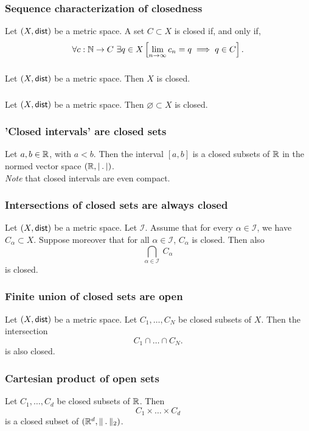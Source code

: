 \subsubsection*{Sequence characterization of closedness}
\uprop Let $(X, \mathsf{dist})$ be a metric space. A set $C \subset X$ is closed if,
and only if,
\[
    \forall c : \mathbb{N} \to C\ \exists q \in X \left[ \lim_{n \to \infty} c_n = q \implies q \in C \right].
\]

\subsubsection*{}
\uprop Let $(X, \mathsf{dist})$ be a metric space. Then $X$ is closed.

\subsubsection*{}
\uprop Let $(X, \mathsf{dist})$ be a metric space. Then $\varnothing \subset X$ is closed.

\subsubsection*{'Closed intervals' are closed sets}
\uprop Let $a, b \in \mathbb{R}$, with $a < b$. Then the interval $[a,b]$ is a closed
subsets of $\mathbb{R}$ in the normed vector space $(\R, \normR)$.\\
\emph{Note} that closed intervals are even compact.

\subsubsection*{Intersections of closed sets are always closed}
\uthm Let $(X, \mathsf{dist})$ be a metric space. Let $\mathcal{I}$.
Assume that for every $\alpha \in \mathcal{I}$, we have $C_\alpha \subset X$.
Suppose moreover that for all $\alpha \in \mathcal{I}$, $C_\alpha$ is closed.
Then also
\[
    \bigcap_{\alpha \in \mathcal{I}}\ C_\alpha
\]
is closed.

\subsubsection*{Finite union of closed sets are open}
\uprop Let $(X, \mathsf{dist})$ be a metric space. Let $C_1, \dots, C_N$ be closed
subsets of $X$. Then the intersection
\[
    C_1 \cap \dots \cap C_N.
\]
is also closed.

\subsubsection*{Cartesian product of open sets}
\uprop Let $C_1, \dots, C_d$ be closed subsets of $\mathbb{R}$. Then
\[
    C_1 \times \dots \times C_d
\]
is a closed subset of $(\R^d, \norm_2)$.

